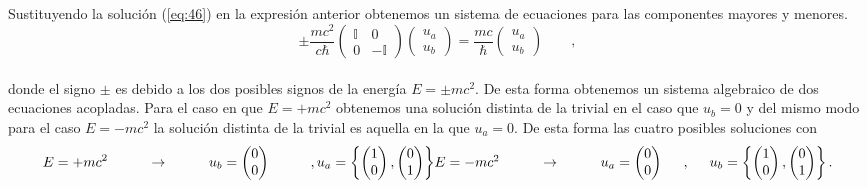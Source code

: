 \documentclass[11pt,letterpaper]{article}     %
\begin{document}
Sustituyendo la solución (\ref{eq:46}) en la expresión anterior obtenemos un sistema de ecuaciones para las componentes mayores y menores.
\begin{equation} \label{eq:48}
\pm \frac{mc^2}{c \hbar}
\begin{pmatrix}
\mathbb{I} & 0 \\ 0 & -\mathbb{I}
\end{pmatrix}
\begin{pmatrix}
u_a \\ u_b
\end{pmatrix} =
\frac{m c}{\hbar}
\begin{pmatrix}
u_a \\u_b
\end{pmatrix} \qquad,
\end{equation} \\
donde el signo $\pm$ es debido a los dos posibles signos de la energía $E= \pm mc^2$. De esta forma obtenemos un sistema algebraico de dos ecuaciones acopladas. Para el caso en que $E=+mc^2$ obtenemos una solución distinta de la trivial en el caso que $u_b=0$ y del mismo modo para el caso $E=-mc^2$ la solución distinta de la trivial es aquella en la que $u_a=0$. De esta forma las cuatro posibles soluciones con
\begin{equation} \label{eq:49}
E=+mc^2 \hspace{1cm} \rightarrow \hspace{1cm} u_b=
\begin{pmatrix}
0 \\ 0
\end{pmatrix} \hspace{5mm} \hspace{5mm}, 
u_a=\left\lbrace
\begin{pmatrix}
1 \\ 0
\end{pmatrix},
\begin{pmatrix}
0 \\ 1
\end{pmatrix} 
\right\rbrace $$\\$$
E=-mc^2 \hspace{1cm} \rightarrow \hspace{1cm} u_a=
\begin{pmatrix}
0 \\ 0
\end{pmatrix} \hspace{5mm} , \hspace{5mm}
u_b=\left\lbrace
\begin{pmatrix}
1 \\ 0
\end{pmatrix},
\begin{pmatrix}
0 \\ 1
\end{pmatrix} 
\right\rbrace .
\end{equation} \\
\end{document}

